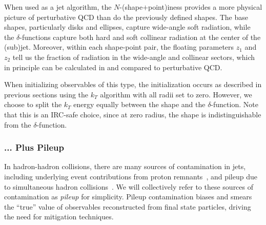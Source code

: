 \documentclass[letterpaper,11pt]{article}
\begin{document}
When used as a jet algorithm, the $N$-(shape$+$point)iness provides a more physical picture of perturbative QCD than do the previously defined shapes. The base shapes, particularly disks and ellipses, capture wide-angle soft radiation, while the $\delta$-functions capture both hard and soft collinear radiation at the center of the (sub)jet. Moreover, within each shape-point pair, the floating parameters $z_1$ and $z_2$ tell us the fraction of radiation in the wide-angle and collinear sectors, which in principle can be calculated in and compared to perturbative QCD.

When initializing observables of this type, the initialization occurs as described in previous sections using the $k_T$ algorithm with all radii set to zero. However, we choose to split the $k_T$ energy equally between the shape and the $\delta$-function. Note that this is an IRC-safe choice, since at zero radius, the shape is indistinguishable from the $\delta$-function.


\subsubsection{... Plus Pileup}\label {sec:plus_pileup}

In hadron-hadron collisions, there are many sources of contamination in jets, including underlying event contributions from proton remnants~\cite{PhysRevD.65.092002, Agocs:2010ft}, and pileup due to simultaneous hadron collisions~\cite{Soyez:2018opl}. We will collectively refer to these sources of contamination as \emph{pileup} for simplicity. Pileup contamination biases and smears the ``true'' value of observables reconstructed from final state particles, driving the need for mitigation techniques. 
\end{document}
